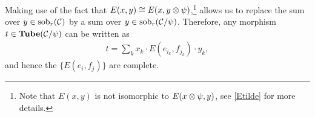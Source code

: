 Making use of the fact that $E(x,y) \cong E(x, y \otimes \psi)$,\footnote{Note that $E(x,y)$ is not isomorphic to $E(x \otimes \psi, y)$, see \eqref{Etilde} for more details.} 
allows us to replace the sum over $y \in \text{sob}_r(\mathcal{C})$ by a sum over $y \in \text{sob}_r(\mathcal{C}/\psi)$.
Therefore, any morphism $t \in \textbf{Tube}(\mathcal{C}/\psi)$ can be written as
\begin{align} 
t = \sum_{k} x_k \cdot E(e_{i_k},f_{j_k} ) \cdot y_{k},
\end{align}
and hence the $\{ E(e_i, f_j) \}$ are complete. 

